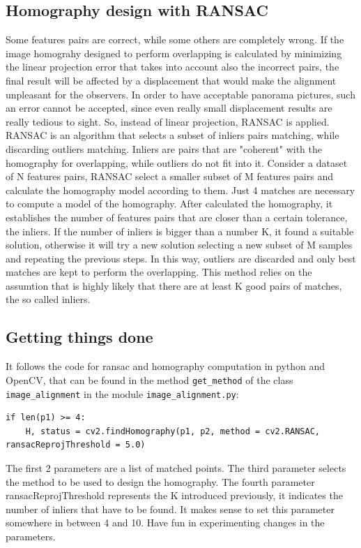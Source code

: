 \documentclass[aps,letterpaper,10pt]{revtex4}
\begin{document}
\subsection{Homography design with RANSAC}
Some features pairs are correct, while some others are completely wrong. If the image homograhy designed to perform overlapping is calculated by minimizing the linear projection error that takes into account also the incorrect pairs, the final result will be affected by a displacement that would make the alignment unpleasant for the observers. In order to have acceptable panorama pictures, such an error cannot be accepted, since even really small displacement results are really tedious to sight. So, instead of linear projection, RANSAC is applied. RANSAC is an algorithm that selects a subset of inliers pairs matching, while discarding outliers matching. Inliers are pairs that are "coherent" with the homography for overlapping, while outliers do not fit into it. Consider a dataset of N features pairs, RANSAC select a smaller subset of M features pairs and calculate the homography model according to them. Just 4 matches are necessary to compute a model of the homography. After calculated the homography, it establishes the number of features pairs that are closer than a certain tolerance, the inliers. If the number of inliers is bigger than a number K, it found a suitable solution, otherwise it will try a new solution selecting a new subset of M samples and repeating the previous steps. In this way, outliers are discarded and only best matches are kept to perform the overlapping. This method relies on the assumtion that is highly likely that there are at least K good pairs of matches, the so called inliers. 
\subsection{Getting things done}
It follows the code for ransac and homography computation in python and OpenCV, that can be found in the method \verb|get_method| of the class \verb|image_alignment| in the module \verb|image_alignment.py|:
\begin{lstlisting}
if len(p1) >= 4:
	H, status = cv2.findHomography(p1, p2, method = cv2.RANSAC, ransacReprojThreshold = 5.0)
\end{lstlisting}
The first 2 parameters are a list of matched points. The third parameter selects the method to be used to design the homography. The fourth parameter ransacReprojThreshold represents the K introduced previously, it indicates the number of inliers that have to be found. It makes sense to set this parameter somewhere in between 4 and 10. Have fun in experimenting changes in the parameters.
\end{document}

